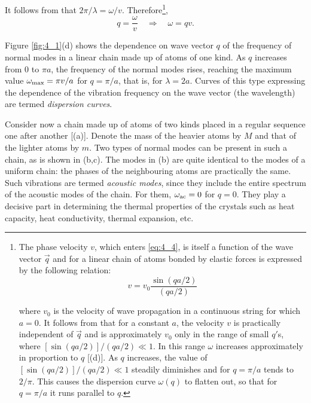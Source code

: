 \noindent
It follows from  that $2\pi/\lambda=\omega/v$. Therefore\footnote{The phase velocity $v$, which enters \eqref{eq:4_4}, is itself a function of the wave vector $\vec{q}$ and for a linear chain of atoms bonded by elastic forces is expressed by the following relation:
\begin{equation}\label{eq:4_4p}
    v = v_0 \frac{\sin(qa/2)}{(qa/2)} \tag{4.4$'$}
\end{equation}

\noindent
where $v_0$ is the velocity of wave propagation in a continuous string for which $a=0$. It follows from  that for a constant $a$, the velocity $v$ is practically independent of $\vec{q}$ and is approximately $v_0$ only in the range of small $q'$s, where $[\sin(qa/2)]/(qa/2)\ll 1$. In this range $\omega$ increases approximately in proportion to $q$ [(d)].
As $q$ increases, the value of $[\sin(qa/2)]/(qa/2)\ll 1$ steadily diminishes and for $q=\pi/a$ tends to $2/\pi$. This causes the dispersion curve $\omega(q)$ to flatten out, so that for $q=\pi/a$ it runs parallel to $q$.},
\begin{equation}\label{eq:4_4}
    q = \frac{\omega}{v} \quad\Rightarrow\quad  \omega = q v.
\end{equation}

Figure \ref{fig:4_1}(d) shows the dependence on wave vector $q$ of the frequency of normal modes in a linear chain made up of atoms of one kind. As $q$ increases from $0$ to $\pi a$, the frequency of the normal modes rises, reaching the maximum value $\omega_{\text{max}}=\pi v/a$ for $q=\pi/a$, that is, for $\lambda=2a$. Curves of this type expressing the dependence of the vibration frequency on the wave vector (the wavelength) are termed \textit{dispersion curves}.

Consider now a chain made up of atoms of two kinds placed in a regular sequence one after another [(a)]. Denote the mass of the heavier atoms by $M$ and that of the lighter atoms by $m$. Two types of normal modes can be present in such a chain, as is shown in (b,c). The modes in (b) are quite identical to the modes of a uniform chain: the phases of the neighbouring atoms are practically the same. Such vibrations are termed \textit{acoustic modes}, since they include the entire spectrum of the acoustic modes of the chain. For them, $\omega_{\text{ac}}=0$ for $q=0$. They play a decisive part in determining the thermal properties of the crystals such as heat capacity, heat conductivity, thermal expansion, etc.

